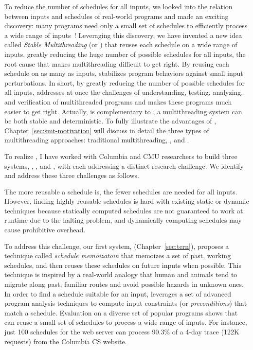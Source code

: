 To reduce the number of schedules for all inputs, we looked into the
relation between inputs and schedules of real-world programs and made an
exciting discovery: many programs need only a small set of schedules to
efficiently process a wide range of inputs~\cite{smt:cacm}! Leveraging this
discovery, we have invented a new idea called \emph{Stable Multithreading} (or 
\emph{\smt}) that reuses each schedule on a wide range of inputs, greatly 
reducing the huge number of possible schedules for all inputs, the root 
cause that makes multithreading difficult to get right. By reusing each 
schedule on as many as inputs, \smt stabilizes program behaviors 
against small input perturbations. In short, by greatly reducing the number of 
possible schedules for all inputs, \smt addresses at once the challenges of 
understanding, testing, analyzing, and verification of multithreaded programs 
and makes these programs much easier to get right. Actually, \smt is 
complementary to \dmt; a multithreading system can be both stable and 
deterministic. To fully illustrate the advantages of \smt, 
Chapter~\ref{sec:smt-motivation} will discuss in detail the three types of 
multithreading approaches: traditional multithreading, \dmt, and \smt.


To realize \smt, I have worked with Columbia and CMU researchers to build
three \smt systems, \tern, \peregrine, and \parrot, with 
each addressing a distinct research challenge. We identify and address these 
three challenges as follows.

 The more reusable a schedule is, the fewer schedules are needed for 
all inputs. However, finding highly reusable schedules is hard with existing 
static or dynamic techniques because statically computed schedules are not 
guaranteed to work at runtime due to the halting problem, and dynamically 
computing schedules may cause prohibitive overhead.

To address this challenge, our first \smt system, 
\tern (Chapter~\ref{sec:tern}), proposes a technique 
called \emph{schedule memoizatoin} that memoizes a set of past, working 
schedules, and then reuses these schedules on future inputs when possible. This 
technique is inspired by a real-world analogy that human and animals tend to 
migrate along past, familiar routes and avoid possible hazards in unknown ones. 
In order to find a schedule suitable for an input, \tern leverages a set of 
advanced program analysis techniques to compute input constraints (or 
\emph{preconditions}) that match a schedule. Evaluation on a diverse set of 
popular programs shows that \tern can reuse a small set of schedules to process 
a wide range of inputs. For instance, just 100 schedules for the \apache web 
server can process 90.3\% of a 4-day trace (122K requests) from the Columbia CS 
website.

